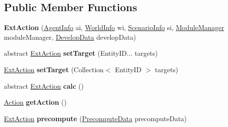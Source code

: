 \subsection*{Public Member Functions}
\begin{DoxyCompactItemize}
\item 
\hypertarget{classadf_1_1component_1_1extaction_1_1ExtAction_a24f45e55bf8015b446ce66c62f2c3e04}{}\label{classadf_1_1component_1_1extaction_1_1ExtAction_a24f45e55bf8015b446ce66c62f2c3e04} 
{\bfseries Ext\+Action} (\hyperlink{classadf_1_1agent_1_1info_1_1AgentInfo}{Agent\+Info} ai, \hyperlink{classadf_1_1agent_1_1info_1_1WorldInfo}{World\+Info} wi, \hyperlink{classadf_1_1agent_1_1info_1_1ScenarioInfo}{Scenario\+Info} si, \hyperlink{classadf_1_1agent_1_1module_1_1ModuleManager}{Module\+Manager} module\+Manager, \hyperlink{classadf_1_1agent_1_1develop_1_1DevelopData}{Develop\+Data} develop\+Data)
\item 
\hypertarget{classadf_1_1component_1_1extaction_1_1ExtAction_a77ec92e848e5ac3daa7b4680c9860b9a}{}\label{classadf_1_1component_1_1extaction_1_1ExtAction_a77ec92e848e5ac3daa7b4680c9860b9a} 
abstract \hyperlink{classadf_1_1component_1_1extaction_1_1ExtAction}{Ext\+Action} {\bfseries set\+Target} (Entity\+I\+D... targets)
\item 
\hypertarget{classadf_1_1component_1_1extaction_1_1ExtAction_ae47347614030259c60100eef0862c523}{}\label{classadf_1_1component_1_1extaction_1_1ExtAction_ae47347614030259c60100eef0862c523} 
\hyperlink{classadf_1_1component_1_1extaction_1_1ExtAction}{Ext\+Action} {\bfseries set\+Target} (Collection$<$ Entity\+ID $>$ targets)
\item 
\hypertarget{classadf_1_1component_1_1extaction_1_1ExtAction_aa059b85523f542e5c78b9eae00351cca}{}\label{classadf_1_1component_1_1extaction_1_1ExtAction_aa059b85523f542e5c78b9eae00351cca} 
abstract \hyperlink{classadf_1_1component_1_1extaction_1_1ExtAction}{Ext\+Action} {\bfseries calc} ()
\item 
\hypertarget{classadf_1_1component_1_1extaction_1_1ExtAction_aaeeadcb73477a938f9461bfd123f8193}{}\label{classadf_1_1component_1_1extaction_1_1ExtAction_aaeeadcb73477a938f9461bfd123f8193} 
\hyperlink{classadf_1_1agent_1_1action_1_1Action}{Action} {\bfseries get\+Action} ()
\item 
\hypertarget{classadf_1_1component_1_1extaction_1_1ExtAction_ad19b84314c27fe9c957481be4ab8d3fb}{}\label{classadf_1_1component_1_1extaction_1_1ExtAction_ad19b84314c27fe9c957481be4ab8d3fb} 
\hyperlink{classadf_1_1component_1_1extaction_1_1ExtAction}{Ext\+Action} {\bfseries precompute} (\hyperlink{classadf_1_1agent_1_1precompute_1_1PrecomputeData}{Precompute\+Data} precompute\+Data)

\end{DoxyCompactItemize}
